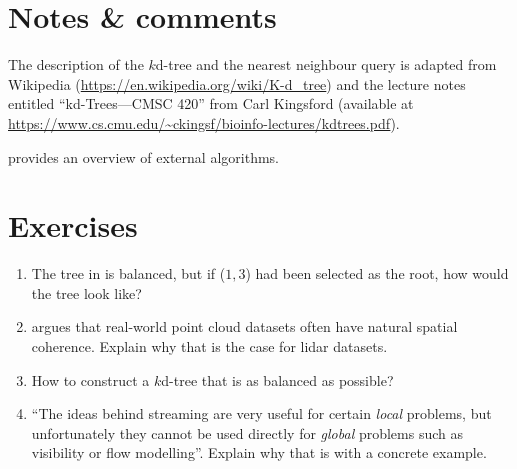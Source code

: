 
%
\section{Notes \& comments}

The description of the $k$d-tree and the nearest neighbour query is adapted from Wikipedia (\url{https://en.wikipedia.org/wiki/K-d_tree}) and the lecture notes entitled ``kd-Trees---CMSC 420'' from Carl Kingsford (available at \url{https://www.cs.cmu.edu/~ckingsf/bioinfo-lectures/kdtrees.pdf}).

\citet{Vitter01} provides an overview of external algorithms.


%
\section{Exercises}

\begin{enumerate}
  \item The tree in  is balanced, but if ($1,3$) had been selected as the root, how would the tree look like?
  \item \citet{Isenburg06-1} argues that real-world point cloud datasets often have natural spatial coherence. Explain why that is the case for lidar datasets.
  \item How to construct a $k$d-tree that is as balanced as possible?
  \item ``The ideas behind streaming are very useful for certain \emph{local} problems, but unfortunately they cannot be used directly for \emph{global} problems such as visibility or flow modelling''. Explain why that is with a concrete example.
\end{enumerate}
